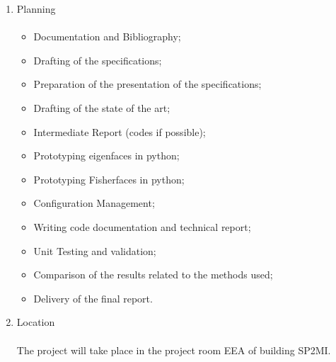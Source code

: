 	\begin{enumerate}
		\item Planning \paragraph{}
		
		\begin{itemize}
			\item Documentation and Bibliography;
			\item Drafting of the specifications;
			\item Preparation of the presentation of the specifications;
			\item Drafting of the state of the art;
			\item Intermediate Report (codes if possible);
			\item Prototyping eigenfaces in python;
			\item Prototyping Fisherfaces in python;
			\item Configuration Management;
			\item Writing code documentation and technical report;
			\item Unit Testing and validation;
			\item Comparison of the results related to the methods used;
			\item Delivery of the final report.\vspace*{0.5cm}
		\end{itemize}
		
		\item Location \paragraph{}
The project will take place in the project room EEA of building SP2MI.\vspace*{0.5cm}
	\end{enumerate}











